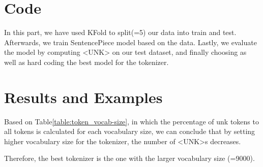 \documentclass[12pt, a4paper]{article}
\begin{document}
\section*{Code}
In this part, we have used KFold to split(=5) our data into train and test. Afterwards, we train SentencePiece model based on the data. Lastly, we evaluate the model by computing <UNK> on our test dataset, and finally choosing as well as hard coding the best model for the tokenizer. 

\section*{Results and Examples}
Based on Table\ref{table:token_vocab-size}, in which the percentage of unk tokens to all tokens is calculated for each vocabulary size, we can conclude that by setting higher vocabulary size for the tokenizer, the number of <UNK>s decreases.

Therefore, the best tokenizer is the one with the larger vocabulary size (=9000).
\end{document}
